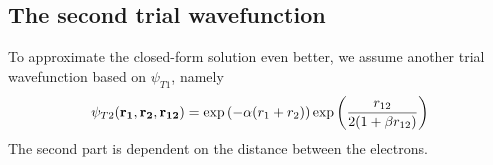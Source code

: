 \documentclass[twocolumn]{article}[12pt]
\newcommand{\eq}[1]{\begin{align*}#1\end{align*}}
\begin{document}
\subsection{The second trial wavefunction}
To approximate the closed-form solution even better,
we assume another trial wavefunction based on $\psi_{T1}$, namely
\eq{
  \psi_{T2} ({\bf r_1},{\bf r_2}, {\bf r_{12}})
    =\exp{\left(-\alpha(r_1+r_2)\right)}
    \exp{\left(\frac{r_{12}}{2(1+\beta r_{12})}\right)}
}
The second part is dependent on the distance between the
electrons.

\section{}
\end{document}
